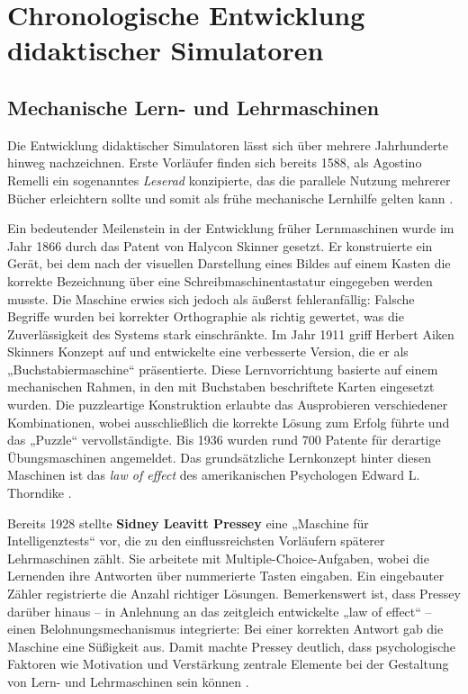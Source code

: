 \section{Chronologische Entwicklung didaktischer Simulatoren}


\subsection{Mechanische Lern- und Lehrmaschinen}

Die Entwicklung didaktischer Simulatoren lässt sich über mehrere Jahrhunderte hinweg nachzeichnen. Erste Vorläufer finden sich bereits 1588, als Agostino Remelli ein sogenanntes \textit{Leserad} konzipierte, das die parallele Nutzung mehrerer Bücher erleichtern sollte und somit als frühe mechanische Lernhilfe gelten kann \parencite{cayetano_geschichte_2022}.

Ein bedeutender Meilenstein in der Entwicklung früher Lernmaschinen wurde im Jahr 1866 durch das Patent von Halycon Skinner gesetzt. Er konstruierte ein Gerät, bei dem nach der visuellen Darstellung eines Bildes auf einem Kasten die korrekte Bezeichnung über eine Schreibmaschinentastatur eingegeben werden musste. Die Maschine erwies sich jedoch als äußerst fehleranfällig: Falsche Begriffe wurden bei korrekter Orthographie als richtig gewertet, was die Zuverlässigkeit des Systems stark einschränkte. Im Jahr 1911 griff Herbert Aiken Skinners Konzept auf und entwickelte eine verbesserte Version, die er als „Buchstabiermaschine“ präsentierte. Diese Lernvorrichtung basierte auf einem mechanischen Rahmen, in den mit Buchstaben beschriftete Karten eingesetzt wurden. Die puzzleartige Konstruktion erlaubte das Ausprobieren verschiedener Kombinationen, wobei ausschließlich die korrekte Lösung zum Erfolg führte und das „Puzzle“ vervollständigte. Bis 1936 wurden rund 700 Patente für derartige Übungsmaschinen angemeldet. Das grundsätzliche Lernkonzept hinter diesen Maschinen ist das \textit{law of effect} des amerikanischen Psychologen Edward L. Thorndike \parencite[S.~3]{niegemann_kompendium_2008}.

Bereits 1928 stellte \textbf{Sidney Leavitt Pressey} eine „Maschine für Intelligenztests“ vor, die zu den einflussreichsten Vorläufern späterer Lehrmaschinen zählt. Sie arbeitete mit Multiple-Choice-Aufgaben, wobei die Lernenden ihre Antworten über nummerierte Tasten eingaben. Ein eingebauter Zähler registrierte die Anzahl richtiger Lösungen. Bemerkenswert ist, dass Pressey darüber hinaus -- in Anlehnung an das zeitgleich entwickelte „law of effect“ -- einen Belohnungsmechanismus integrierte: Bei einer korrekten Antwort gab die Maschine eine Süßigkeit aus. Damit machte Pressey deutlich, dass psychologische Faktoren wie Motivation und Verstärkung zentrale Elemente bei der Gestaltung von Lern- und Lehrmaschinen sein können \parencites[S.~705]{benjamin_history_1988}[S.~969f]{skinner_teaching_1958}.


